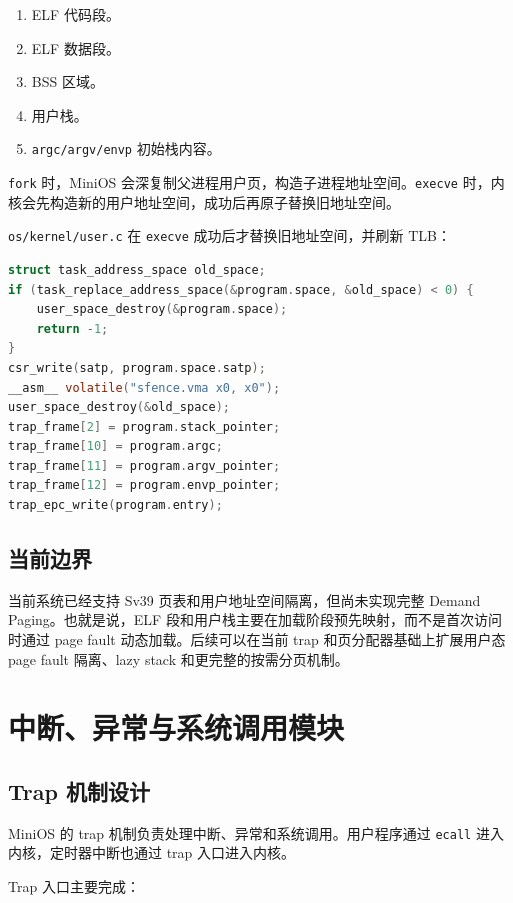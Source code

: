 \documentclass[UTF8,a4paper,12pt,openany,fontset=fandol]{ctexrep}
\begin{document}
\begin{enumerate}
\item ELF 代码段。
\item ELF 数据段。
\item BSS 区域。
\item 用户栈。
\item \nolinkurl{argc/argv/envp} 初始栈内容。
\end{enumerate}

\nolinkurl{fork} 时，MiniOS 会深复制父进程用户页，构造子进程地址空间。\nolinkurl{execve} 时，内核会先构造新的用户地址空间，成功后再原子替换旧地址空间。

\nolinkurl{os/kernel/user.c} 在 \nolinkurl{execve} 成功后才替换旧地址空间，并刷新 TLB：

\begin{lstlisting}[language=c]
struct task_address_space old_space;
if (task_replace_address_space(&program.space, &old_space) < 0) {
    user_space_destroy(&program.space);
    return -1;
}
csr_write(satp, program.space.satp);
__asm__ volatile("sfence.vma x0, x0");
user_space_destroy(&old_space);
trap_frame[2] = program.stack_pointer;
trap_frame[10] = program.argc;
trap_frame[11] = program.argv_pointer;
trap_frame[12] = program.envp_pointer;
trap_epc_write(program.entry);
\end{lstlisting}

\section{当前边界}

当前系统已经支持 Sv39 页表和用户地址空间隔离，但尚未实现完整 Demand Paging。也就是说，ELF 段和用户栈主要在加载阶段预先映射，而不是首次访问时通过 page fault 动态加载。后续可以在当前 trap 和页分配器基础上扩展用户态 page fault 隔离、lazy stack 和更完整的按需分页机制。

\chapter{中断、异常与系统调用模块}

\section{Trap 机制设计}

MiniOS 的 trap 机制负责处理中断、异常和系统调用。用户程序通过 \nolinkurl{ecall} 进入内核，定时器中断也通过 trap 入口进入内核。

Trap 入口主要完成：
\end{document}
